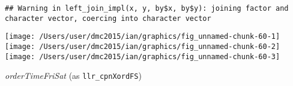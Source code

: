 \documentclass[10pt]{report}
\newenvironment{Shaded}{}{}
\newcommand{\KeywordTok}[1]{\textcolor[rgb]{0.00,0.44,0.13}{\textbf{{#1}}}}
\newcommand{\DataTypeTok}[1]{\textcolor[rgb]{0.56,0.13,0.00}{{#1}}}
\newcommand{\StringTok}[1]{\textcolor[rgb]{0.25,0.44,0.63}{{#1}}}
\newcommand{\NormalTok}[1]{{#1}}
\begin{document}
\begin{Shaded}
\end{Shaded}

\begin{verbatim}
## Warning in left_join_impl(x, y, by$x, by$y): joining factor and character vector, coercing into character vector
\end{verbatim}

\begin{Shaded}
\end{Shaded}

\begin{center}\texttt{[image: /Users/user/dmc2015/ian/graphics/fig\_unnamed-chunk-60-1]} \texttt{[image: /Users/user/dmc2015/ian/graphics/fig\_unnamed-chunk-60-2]} \texttt{[image: /Users/user/dmc2015/ian/graphics/fig\_unnamed-chunk-60-3]} \end{center}

\emph{orderTimeFriSat} (as \texttt{llr\_cpnXordFS})
\end{document}
